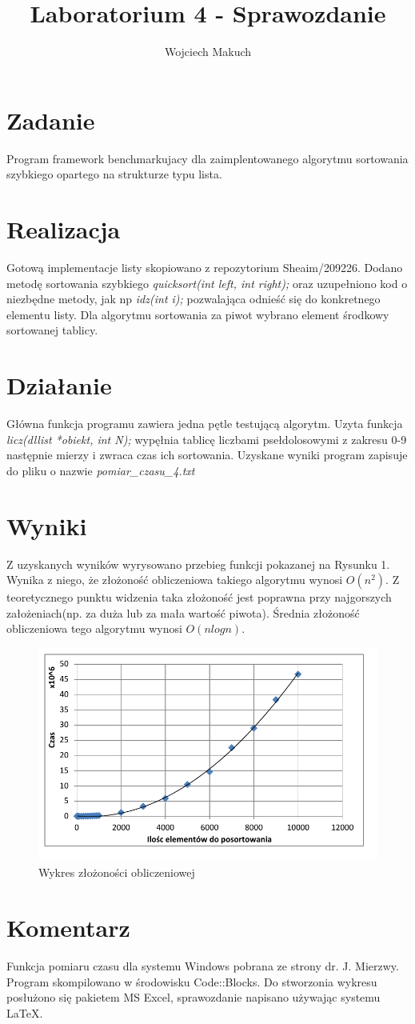 \documentclass[11pt,a4paper]{article}
\title{Laboratorium 4 - Sprawozdanie}
\author{Wojciech Makuch}
\begin{document}
\maketitle
\section{Zadanie}
Program framework benchmarkujacy dla zaimplentowanego algorytmu sortowania szybkiego opartego na strukturze typu lista.
\section{Realizacja}
Gotową implementacje listy skopiowano z repozytorium Sheaim/209226. Dodano metodę sortowania szybkiego \textsl{quicksort(int left, int right);} oraz uzupełniono kod o niezbędne metody, jak np \textsl{idz(int i);} pozwalająca odnieść się do konkretnego elementu listy. Dla algorytmu sortowania za piwot wybrano element środkowy sortowanej tablicy.

\section{Działanie}
Główna funkcja programu zawiera jedna pętle testującą algorytm. Uzyta funkcja \textsl{licz(dllist *obiekt, int N);} wypęłnia tablicę liczbami psełdolosowymi z zakresu 0-9 następnie mierzy i zwraca czas ich sortowania. Uzyskane wyniki program zapisuje do pliku o nazwie \textsl{pomiar\_czasu\_4.txt}

\section{Wyniki}
Z uzyskanych wyników wyrysowano przebieg funkcji pokazanej na Rysunku 1. Wynika z niego, że złożoność obliczeniowa takiego algorytmu wynosi $O(n^{2})$. Z teoretycznego punktu widzenia taka złożoność jest poprawna przy najgorszych założeniach(np. za duża lub za mała wartość piwota). Średnia złożoność obliczeniowa tego algorytmu wynosi $O(n logn)$.
\begin{figure}[t!]
\centering
\includegraphics[scale=1]{wykr1.pdf}
\caption{Wykres złożoności obliczeniowej}
\label{fig:wykres1}
\end{figure}
\section{Komentarz}
Funkcja pomiaru czasu dla systemu Windows pobrana ze strony dr. J. Mierzwy. Program skompilowano w środowisku Code::Blocks. Do stworzonia wykresu posłużono się pakietem MS Excel, sprawozdanie napisano używając systemu \LaTeX.
\end{document}
